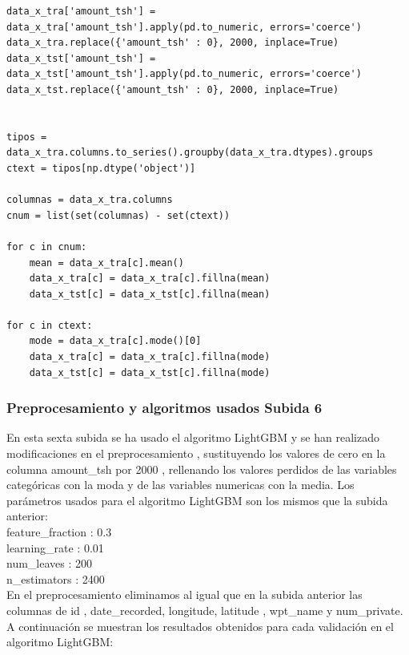 	\lstset{language=python}
	\begin{lstlisting}[frame=single]
data_x_tra['amount_tsh'] = data_x_tra['amount_tsh'].apply(pd.to_numeric, errors='coerce')
data_x_tra.replace({'amount_tsh' : 0}, 2000, inplace=True)
data_x_tst['amount_tsh'] = data_x_tst['amount_tsh'].apply(pd.to_numeric, errors='coerce')
data_x_tst.replace({'amount_tsh' : 0}, 2000, inplace=True)


tipos = data_x_tra.columns.to_series().groupby(data_x_tra.dtypes).groups
ctext = tipos[np.dtype('object')]

columnas = data_x_tra.columns  
cnum = list(set(columnas) - set(ctext))

for c in cnum:
	mean = data_x_tra[c].mean()
	data_x_tra[c] = data_x_tra[c].fillna(mean)
	data_x_tst[c] = data_x_tst[c].fillna(mean)
	
for c in ctext:
	mode = data_x_tra[c].mode()[0]
	data_x_tra[c] = data_x_tra[c].fillna(mode)
	data_x_tst[c] = data_x_tst[c].fillna(mode)
	\end{lstlisting}
	
	
	\subsubsection[Preprocesamiento y algoritmos usados Subida 6]{Preprocesamiento y algoritmos usados Subida 6}
	
	En esta sexta subida se ha usado el algoritmo LightGBM y se han realizado modificaciones 
	en el preprocesamiento , sustituyendo los valores de cero en la columna amount\_tsh
	por 2000 , rellenando los valores perdidos de las variables categóricas con la moda y de las 
	variables numericas con la media. Los parámetros usados para el algoritmo LightGBM son los mismos que la subida anterior: \\
	
	feature\_fraction : 0.3 \\
	learning\_rate : 0.01 \\
	num\_leaves : 200 \\
	n\_estimators : 2400 \\
	
	En el preprocesamiento eliminamos al igual que en la subida anterior las columnas de id , date\_recorded,
	longitude, latitude , wpt\_name y num\_private. A continuación se muestran los resultados 
	obtenidos para cada validación en el algoritmo LightGBM: \\

